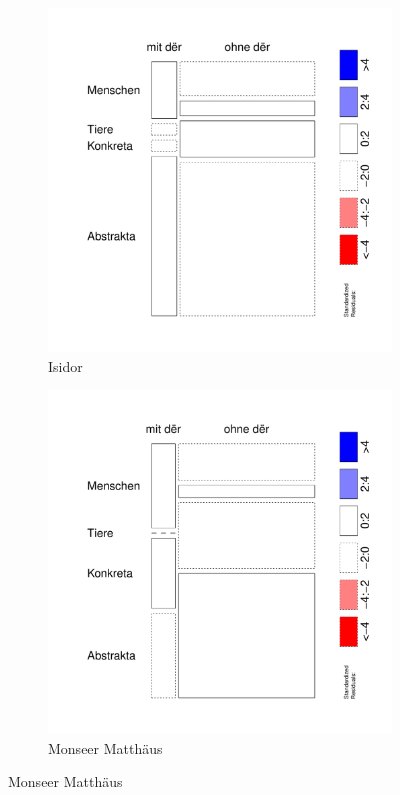 \begin{figure}
\begin{subfigure}[b]{.5\linewidth}
  \includegraphics[width=6 cm]{generated/images/bel-hapaxe-residuals-I}
\caption {Isidor}
\end{subfigure}%
\begin{subfigure}[b]{.5\linewidth}
  \includegraphics[width=6 cm]{generated/images/bel-hapaxe-residuals-M}
\caption {Monseer Matthäus}
\end{subfigure}


\end{figure}

